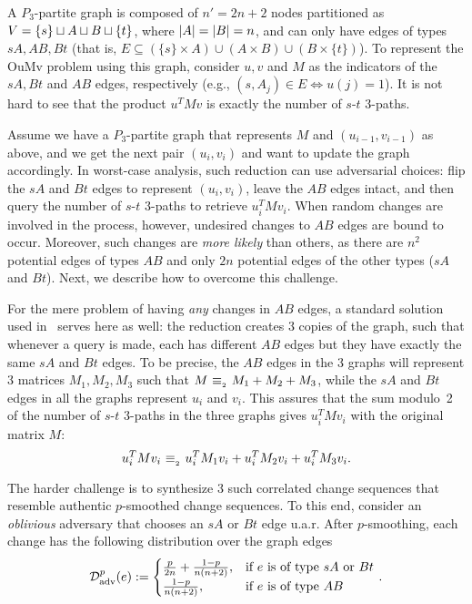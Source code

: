 \documentclass[letter,11pt]{article}
\newcommand{\oumv}{\textnormal{\textsf{OuMv}}\xspace}
\newcommand{\paths}[3]{${#1}$-${#2}$ ${#3}$-paths\xspace}
\newcommand{\advdist}{\mathcal{D}_\textnormal{adv}}
\begin{document}
A $P_3$-partite graph is composed of $n'=2n+2$ nodes partitioned as 
$V = \{s\} \sqcup A \sqcup B \sqcup \{t\}$, where $\card{A} = \card{B} = n$,
and can only have edges of types 
$sA, AB, Bt$
(that is, $E\subseteq (\{s\}\times A)\cup(A\times B)\cup(B\times\{t\})$).
To represent the \oumv problem using this graph,
consider $u,v$ and $M$ as the indicators of the $sA, Bt$ and $AB$ edges, respectively (e.g., $(s,A_j)\in E\iff u(j)=1$).
It is not hard to see that the product $u^TMv$ is exactly the number of \paths st3.

Assume we have a $P_3$-partite graph that represents $M$ and $(u_{i-1},v_{i-1})$ as above,
and we get the next pair $(u_i,v_i)$
and want to update the graph accordingly.
In worst-case analysis, such reduction can use adversarial choices: flip the $sA$ and $Bt$ edges to represent $(u_i,v_i)$, leave the $AB$ edges intact,
and then query the number of \paths st3 to retrieve $u_i^TMv_i$.
When random changes are involved in the process, however, undesired changes to $AB$ edges are bound to occur. 
Moreover, such changes are \emph{more likely} than others, as there are $n^2$ potential edges of types $AB$ and only $2n$ potential edges of the other types ($sA$ and $Bt$).
Next, we describe how to overcome this challenge.

For the mere problem of having \emph{any} changes in $AB$ edges, a standard solution used in~\cite{HLS22} serves here as well: the reduction creates $3$ copies of the graph, 
such that whenever a query is made, each has different $AB$ edges but they have exactly the same $sA$ and $Bt$ edges.
To be precise, the $AB$ edges in the 3 graphs will represent 3 matrices $M_1,M_2,M_3$ such that $M \ {\equiv_{_{2}}}\  M_1+M_2+M_3$, 
while the $sA$ and $Bt$ edges in all the graphs represent $u_i$ and $v_i$.
This assures that the sum modulo~2 of the number of \paths st3 in the three graphs gives $u_i^TMv_i$ with the original matrix $M$:
\begin{equation}
    \label{eq:intro:3_matrices}
    u_i^T M v_i \ {\equiv_{_{2}}}\  u_i^T M_1 v_i + u_i^T M_2 v_i + u_i^T M_3 v_i .    
\end{equation}

The harder challenge is to synthesize $3$ such correlated change sequences that resemble authentic $p$-smoothed change sequences. 
To this end, consider an \emph{oblivious} adversary that chooses an $sA$ or $Bt$ edge u.a.r. 
After $p$-smoothing, each change has the following distribution over the graph edges
\[
\begin{aligned}
	\advdist^p (e):=
	\begin{cases}
		\frac{p}{2n} + \frac{1-p}{n(n+2)}, & \text{if $e$ is of type $sA$ or $Bt$}\\
		\frac{1-p}{n(n+2)}, & \text{if $e$ is of type $AB$}
	\end{cases}\;.
\end{aligned}
\]
\end{document}
